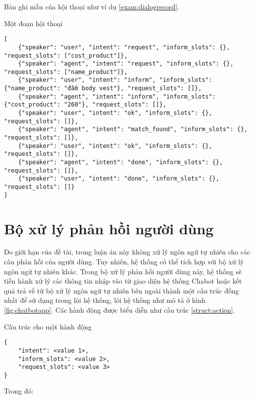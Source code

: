 Bản ghi mẫu của hội thoại như ví dụ \ref{exam:dialogrecord}.

\renewcommand{\textboxenvname}{Ví dụ}
\begin{textbox}{Một đoạn hội thoại}
\begin{Verbatim}[breaklines=true, breakanywhere=true]
[
    {"speaker": "user", "intent": "request", "inform_slots": {}, "request_slots": ["cost_product"]},
    {"speaker": "agent", "intent": "request", "inform_slots": {}, "request_slots": ["name_product"]},
    {"speaker": "user", "intent": "inform", "inform_slots": {"name_product": "đầm body vest"}, "request_slots": []},
    {"speaker": "agent", "intent": "inform", "inform_slots": {"cost_product": "260"}, "request_slots": []},
    {"speaker": "user", "intent": "ok", "inform_slots": {}, "request_slots": []},
    {"speaker": "agent", "intent": "match_found", "inform_slots": {}, "request_slots": []},
    {"speaker": "user", "intent": "ok", "inform_slots": {}, "request_slots": []},
    {"speaker": "agent", "intent": "done", "inform_slots": {}, "request_slots": []},
    {"speaker": "user", "intent": "done", "inform_slots": {}, "request_slots": []}
]
\end{Verbatim}
\end{textbox}

\section{Bộ xử lý phản hồi người dùng}
Do giới hạn của đề tài, trong luận án này không xử lý ngôn ngữ tự nhiên
cho các câu phản hồi của người dùng. Tuy nhiên, hệ thống có thể tích hợp
với bộ xử lý ngôn ngữ tự nhiên khác. Trong bộ xử lý phản hồi người dùng
này, hệ thống sẽ tiến hành xử lý các thông tin nhập vào từ giao diện
hệ thống Chabot hoặc kết quả trả về từ bộ xử lý ngôn ngữ tự nhiên
bên ngoài thành một cấu trúc đồng nhất để sử dụng trong lõi hệ thống,
lõi hệ thống như mô tả ở hình \ref{fig:chatbotapp}. Các hành động được
biểu diễn như cấu trúc \ref{struct:action}.

\renewcommand{\textboxenvname}{Cấu trúc}
\begin{textbox}{Cấu trúc cho một hành động}
\begin{Verbatim}[breaklines=true, breakanywhere=true]
{
    "intent": <value 1>,
    "inform_slots": <value 2>,
    "request_slots": <value 3>
}
\end{Verbatim}
\end{textbox}

Trong đó:

